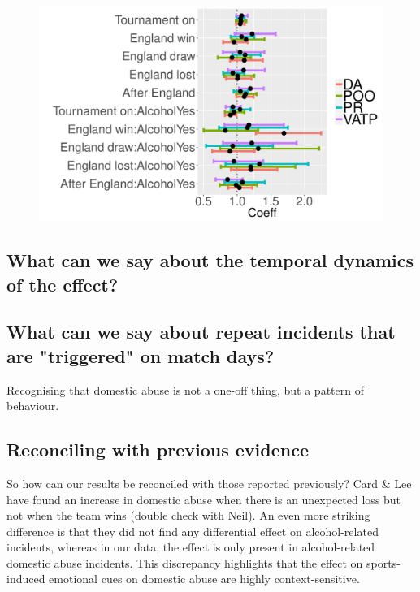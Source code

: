 \documentclass[12pt, letterpaper]{article}
\begin{document}
\begin{figure}[htb!]
\centering
\includegraphics[width=1\textwidth]{DA_compare.pdf}
\label{fig:DA_compare}
\end{figure}


\subsection{What can we say about the temporal dynamics of the effect?}


\subsection{What can we say about repeat incidents that are "triggered" on match days?}

Recognising that domestic abuse is not a one-off thing, but a pattern of behaviour.



\subsection{Reconciling with previous evidence}

So how can our results be reconciled with those reported previously? Card \& Lee have found an increase in domestic abuse when there is an unexpected loss but not when the team wins (double check with Neil). An even more striking difference is that they did not find any differential effect on alcohol-related incidents, whereas in our data, the effect is only present in alcohol-related domestic abuse incidents. This discrepancy highlights that the effect on sports-induced emotional cues on domestic abuse are highly context-sensitive.
\end{document}
